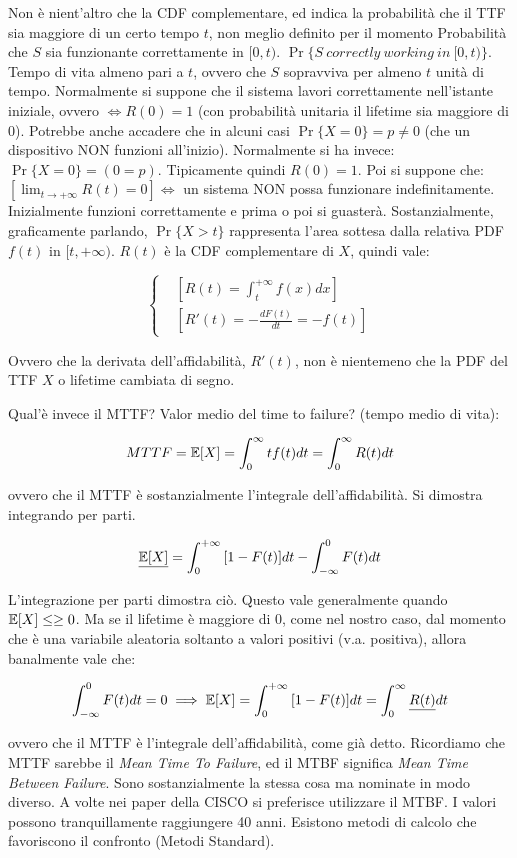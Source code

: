 Non è nient'altro che la CDF complementare, ed indica la probabilità che il TTF sia maggiore di un certo tempo $t$, non meglio definito per il momento
Probabilità che $\mathit{S}$ sia funzionante correttamente in $[0,t)$. $\Pr\{\mathit{S}\ correctly\ working\ in\ [0,t)\}$. Tempo di vita almeno pari a $t$, ovvero che $\mathit{S}$ sopravviva per almeno $t$ unità di tempo. Normalmente si suppone che il sistema lavori correttamente nell'istante iniziale, ovvero $\iff R(0)=1$ (con probabilità unitaria il lifetime sia maggiore di 0). Potrebbe anche accadere che in alcuni casi $\Pr\{X=0\} = p\neq 0$ (che un dispositivo NON funzioni all'inizio). Normalmente si ha invece: $\Pr\{X=0\} = (0=p)$. Tipicamente quindi $R(0)=1$. Poi si suppone che: $[\lim_{t\to+\infty}{R(t)} = 0] \iff$ un sistema NON possa funzionare indefinitamente. Inizialmente funzioni correttamente e prima o poi si guasterà. Sostanzialmente, graficamente parlando, $\Pr\{X > t\}$ rappresenta l'area sottesa dalla relativa PDF $f(t)$ in $[t,+\infty)$. $R(t)$ è la CDF complementare di $X$, quindi vale:

\[
	\left\{
	\begin{aligned}
	&[R(t) = \int_t^{+\infty}{f(x)dx}]\\
	&[R'(t) = -\frac{d F(t)}{dt} = -f(t)]
	\end{aligned}
	\right.
\]

Ovvero che la derivata dell'affidabilità, $R'(t)$, non è nientemeno che la PDF del TTF $X$ o lifetime cambiata di segno. 

Qual'è invece il MTTF? Valor medio del time to failure? (tempo medio di vita):

\[
	MTTF = \operatorname{\mathbb{E}}[X] = \int_0^\infty{tf(t)dt} = \int_0^\infty{R(t)dt}
\]

ovvero che il MTTF è sostanzialmente l'integrale dell'affidabilità. Si dimostra integrando per parti.

\[
	\underline{\operatorname{\mathbb{E}}[X]} = \int_0^{+\infty}{[1-F(t)]dt} - \int_{-\infty}^0{F(t)dt}
\]

L'integrazione per parti dimostra ciò. Questo vale generalmente quando $\operatorname{\mathbb{E}}[X] \leq\geq 0$. Ma se il lifetime è maggiore di 0, come nel nostro caso, dal momento che è una variabile aleatoria soltanto a valori positivi (v.a. positiva), allora banalmente vale che: 

\[
	\int_{-\infty}^0{F(t)dt} = 0 \implies \operatorname{\mathbb{E}}[X] = \int_0^{+\infty}{[1-F(t)]dt} = \int_0^\infty{\underline{R(t)}dt}
\]

ovvero che il MTTF è l'integrale dell'affidabilità, come già detto. Ricordiamo che MTTF sarebbe il \textit{Mean Time To Failure}, ed il MTBF significa \textit{Mean Time Between Failure}. Sono sostanzialmente la stessa cosa ma nominate in modo diverso. A volte nei paper della CISCO si preferisce utilizzare il MTBF. I valori possono tranquillamente raggiungere 40 anni. Esistono metodi di calcolo che favoriscono il confronto (Metodi Standard).  

